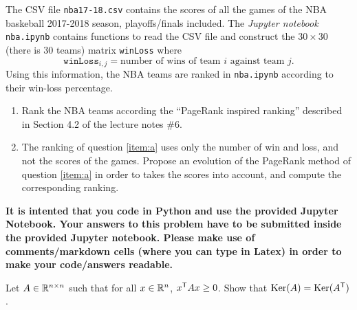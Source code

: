 \documentclass[11pt,nocut]{article}
\begin{document}
\begin{problem}[5 points]
	The CSV file \texttt{nba17-18.csv} contains the scores of all the games of the NBA baskeball 2017-2018 season, playoffs/finals included. 
	The \emph{Jupyter notebook} \texttt{nba.ipynb} contains functions to read the CSV file and construct the $30 \times 30$ (there is $30$ teams) matrix \texttt{winLoss} where
	$$
	\texttt{winLoss}_{i,j} = \text{number of wins of team $i$ against team $j$.}
	$$
	Using this information, the NBA teams are ranked in \texttt{nba.ipynb} according to their win-loss percentage.
	\begin{enumerate}[label=\normalfont(\textbf{\alph*})]
		\item \label{item:a} Rank the NBA teams according the ``PageRank inspired ranking'' described in Section 4.2 of the lecture notes \#6.
		\item The ranking of question \ref{item:a} uses only the number of win and loss, and not the scores of the games. Propose an evolution of the PageRank method of question \ref{item:a} in order to takes the scores into account, and compute the corresponding ranking.
	\end{enumerate}

	\textbf{It is intented that you code in Python and use the provided Jupyter Notebook. Your answers to this problem have to be submitted inside the provided Jupyter notebook. Please make use of comments/markdown cells (where you can type in Latex) in order to make your code/answers readable.}
\end{problem}


\vspace{1mm}




\begin{problem}[$\star$]
	Let $A \in \mathbb{R}^{n \times n}$ such that for all $x \in \mathbb{R}^n$, $x^{{\sf T}} A x \geq 0$. Show that ${{\rm Ker}}(A) = {{\rm Ker}}(A^{{\sf T}})$.
\end{problem}
\vspace{1cm}
\centerline{}

%
%
\end{document}
